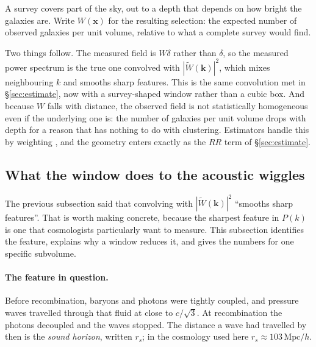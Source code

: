 \documentclass[12pt]{article}
\newcommand{\bk}{\mathbf{k}}
\newcommand{\bx}{\mathbf{x}}
\begin{document}
A survey covers part of the sky, out to a depth that depends on how
bright the galaxies are.  Write $W(\bx)$ for the resulting selection:
the expected number of observed galaxies per unit volume, relative to
what a complete survey would find.

Two things follow.  The measured field is $W\delta$ rather than $\delta$,
so the measured power spectrum is the true one convolved with
$|\widetilde W(\bk)|^2$, which mixes neighbouring $k$ and smooths sharp
features.  This is the same convolution met in
\S\ref{sec:estimate}, now with a survey-shaped window rather than a
cubic box.  And because $W$ falls with distance, the observed field is
not statistically homogeneous even if the underlying one is: the number
of galaxies per unit volume drops with depth for a reason that has
nothing to do with clustering.  Estimators handle this by weighting
\citep{FKP1994}, and the geometry enters exactly as the $RR$ term of
\S\ref{sec:estimate}.


\subsection{What the window does to the acoustic wiggles}
\label{sec:bao-smoothing}

The previous subsection said that convolving with $|\widetilde W(\bk)|^2$
``smooths sharp features''.  That is worth making concrete, because the
sharpest feature in $P(k)$ is one that cosmologists particularly want to
measure.  This subsection identifies the feature, explains why a window
reduces it, and gives the numbers for one specific subvolume.

\paragraph{The feature in question.}
Before recombination, baryons and photons were tightly coupled, and
pressure waves travelled through that fluid at close to $c/\sqrt3$.  At
recombination the photons decoupled and the waves stopped.  The distance a
wave had travelled by then is the \emph{sound horizon}, written $r_s$; in
the cosmology used here $r_s \approx 103\,\mathrm{Mpc}/h$.
\end{document}
